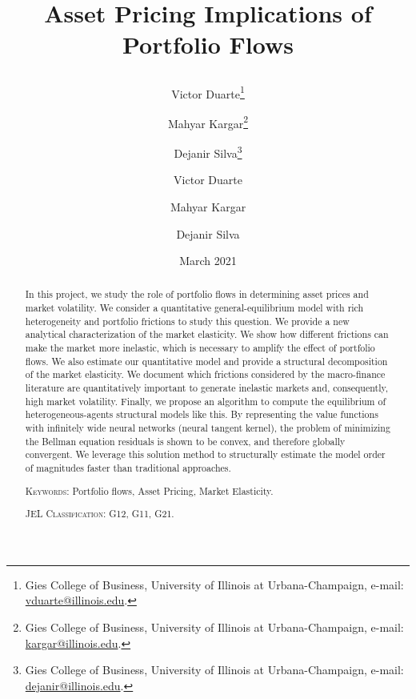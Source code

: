 \usepackage[en-US]{datetime2}
\usepackage{mathtools}
 \usepackage{xcolor}

\newcommand{\comments}[1]
{\par {\bfseries \color{blue} #1 \par}}

\usepackage[draft]{todonotes}

\title{\textbf{Asset Pricing Implications of Portfolio Flows}
\author{ 
Victor Duarte\thanks{Gies College of Business, University of Illinois at Urbana-Champaign, e-mail: \href{mailto:vduarte@illinois.edu}{vduarte@illinois.edu}.}\and 
Mahyar Kargar\thanks{Gies College of Business, University of Illinois at Urbana-Champaign, e-mail: \href{mailto:kargar@illinois.edu}{kargar@illinois.edu}.}\and  Dejanir Silva\thanks{Gies College of Business, University of Illinois at Urbana-Champaign, e-mail: \href{dejanir@illinois.edu}{dejanir@illinois.edu}.}}
}
\author{ 
Victor Duarte
\and 
Mahyar Kargar\and 
Dejanir Silva
}
\date{March 2021}

  \sloppy
  \maketitle
  \thispagestyle{empty}
  
  \begin{abstract} 
  \noindent 
  In this project, we study the role of portfolio flows in determining asset prices and market volatility. 
  We consider a quantitative general-equilibrium model with rich heterogeneity and portfolio frictions to study this question. 
  We provide a new analytical characterization of the market elasticity. We show how different frictions can make the market more inelastic, which is necessary to amplify the effect of portfolio flows.
  We also estimate our quantitative model and provide a structural decomposition of the market elasticity. We document which frictions considered by the macro-finance literature are quantitatively important to generate inelastic markets and, consequently, high market volatility. Finally, we propose an algorithm to compute the equilibrium of heterogeneous-agents structural models like this. By representing the value functions with infinitely wide neural networks (neural tangent kernel), the problem of minimizing the Bellman equation residuals is shown to be convex, and therefore globally convergent. We leverage this solution method to structurally estimate the model order of magnitudes faster than traditional approaches.
  \vspace{10mm} 
  \bigskip
  
  \noindent 
  \textsc{Keywords}: Portfolio flows, Asset Pricing, Market Elasticity. 
  
  \medskip
  \noindent
  \textsc{JEL Classification}: G12, G11, G21.   
\end{abstract}
  
